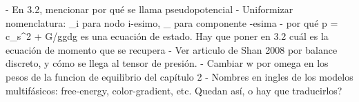 - En 3.2, mencionar por qu\'e se llama pseudopotencial
- Uniformizar nomenclatura: _i para nodo i-esimo, _{\alpha} para componente {\alpha-}esima
- por qu\'e p = \rho c_s^2 + G/ggdg es una ecuaci\'on de estado. Hay que poner en 3.2 cu\'al es la ecuaci\'on de momento que se recupera
- Ver articulo de Shan 2008 por balance discreto, y c\'omo se llega al tensor de presi\'on.
- Cambiar w por omega en los pesos de la funcion de equilibrio del cap\'itulo 2
- Nombres en ingles de los modelos multif\'asicos: free-energy, color-gradient, etc. Quedan as\'i, o hay que traducirlos?
